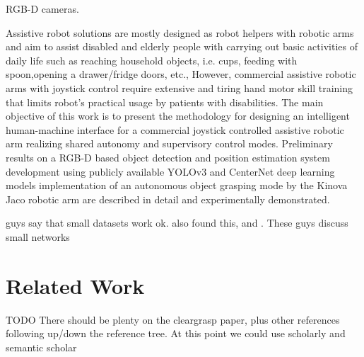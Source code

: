 RGB-D cameras.

\cite{RakhimkulEtAl2019} Assistive robot solutions are mostly designed as robot helpers with robotic arms and aim to assist disabled and elderly people with carrying out basic activities of daily life such as reaching household objects, i.e. cups, feeding with spoon,opening a drawer/fridge doors, etc., However, commercial assistive robotic arms with joystick control require extensive and tiring hand motor skill training that limits robot’s practical usage by patients with disabilities. The main objective of this work is to present the methodology for designing an intelligent human-machine interface for a commercial joystick controlled assistive robotic arm realizing shared autonomy and supervisory control modes. Preliminary results on a RGB-D based object detection and position estimation system development using publicly available YOLOv3 and CenterNet deep learning models implementation of an autonomous object grasping mode by the Kinova Jaco robotic arm are described in detail and experimentally demonstrated.

\cite{batzner2021se3equivariant} guys say that small datasets work ok.\cite{power2021simple} also found this, and \cite{vu2021machine}. These guys \cite{frankle2019lottery} discuss small networks




\section{Related Work}
\label{context:related-work} 
TODO There should be plenty on the cleargrasp paper, plus other references following up/down the reference tree. At this point we could use scholarly and semantic scholar

\lipsum[1]






